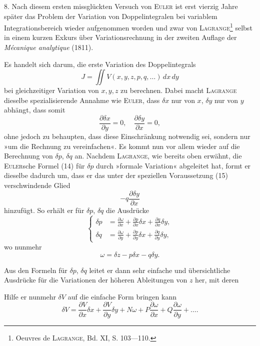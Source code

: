 8. Nach diesem ersten missglückten Versuch von \textsc{Euler} ist erst vierzig
Jahre später das Problem der Variation von Doppelintegralen bei variablem
Integrationsbereich wieder aufgenommen worden und zwar von \textsc{Lagrange}\footnote{Oeuvres de \textsc{Lagrange}, Bd. XI, S. 103—110.}
selbst in einem kurzen Exkurs über Variationsrechnung in der zweiten Auflage
der \textit{Mécanique analytique} (1811).

Es handelt sich darum, die erste Variation des Doppelintegrals
\[
J=\iint V(x,y,z,p,q,\ldots)\,dx\,dy
\]
bei gleichzeitiger Variation von $x,y,z$ zu berechnen. Dabei macht \textsc{Lagrange}
dieselbe spezialisierende Annahme wie \textsc{Euler}, dass $\delta x$ nur von $x$, $\delta y$ nur von
$y$ abhängt, dass somit
\begin{equation*}
\frac{\partial\delta x}{\partial y}=0,\quad\frac{\partial\delta y}{\partial x}=0,\tag{15}
\end{equation*}
ohne jedoch zu behaupten, dass diese Einschränkung notwendig sei, sondern
nur »um die Rechnung zu vereinfachen«. Es kommt nun vor allem wieder
auf die Berechnung von $\delta p$, $\delta q$ an. Nachdem \textsc{Lagrange}, wie bereits oben
erwähnt, die \textsc{Euler}sche Formel (14) für $\delta p$ durch »formale Variation« abgeleitet
hat, formt er dieselbe dadurch um, dass er das unter der speziellen Voraussetzung
(15) verschwindende Glied
\[
-q\frac{\partial\delta y}{\partial x}
\]
hinzufügt. So erhält er für $\delta p$, $\delta q$ die Ausdrücke
\begin{equation*}
\left\{\begin{aligned}
\delta p&=\frac{\partial\omega}{\partial x}+\frac{\partial p}{\partial x}\delta x+\frac{\partial q}{\partial x}\delta y,\\
\delta q&=\frac{\partial\omega}{\partial y}+\frac{\partial p}{\partial y}\delta x+\frac{\partial q}{\partial y}\delta y,
\end{aligned}\right.\tag{16}
\end{equation*}
wo nunmehr
\begin{equation*}
\omega=\delta z-p\delta x-q\delta y.\tag{17}
\end{equation*}

Aus den Formeln für $\delta p$, $\delta q$ leitet er dann sehr einfache und übersichtliche
Ausdrücke für die Variationen der höheren Ableitungen von $z$ her, mit deren
\par\clearpage{}
\noindent Hilfe er nunmehr $\delta V$ auf die einfache Form bringen kann
\begin{equation*}
\delta V=\frac{\partial V}{\partial x}\delta x+\frac{\partial V}{\partial y}\delta y+N\omega
+P\frac{\partial\omega}{\partial x}+Q\frac{\partial\omega}{\partial y}+\ldots.\tag{18}
\end{equation*}

